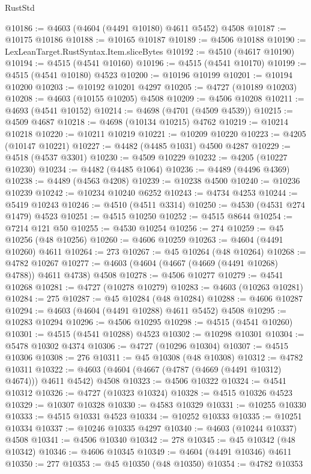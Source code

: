 \begin{lexlean}{RustStd}
\begin{coremodule}
@10186 := @4603 (@4604 (@4491 @10180) @4611 @5452) @4508
@10187 := @10175 @10186
@10188 := @10165 @10187
@10189 := @4506 @10188
@10190 := LexLeanTarget.RustSyntax.Item.sliceBytes
@10192 := @4510 (@4617 @10190)
@10194 := @4515 (@4541 @10160)
@10196 := @4515 (@4541 @10170)
@10199 := @4515 (@4541 @10180) @4523
@10200 := @10196 @10199
@10201 := @10194 @10200
@10203 := @10192 @10201 @4297
@10205 := @4727 (@10189 @10203)
@10208 := @4603 (@10155 @10205) @4508
@10209 := @4506 @10208
@10211 := @4693 (@4541 @10152)
@10214 := @4698 (@4701 (@4509 @4539))
@10215 := @4509 @4687
@10218 := @4698 (@10134 @10215) @4762
@10219 := @10214 @10218
@10220 := @10211 @10219
@10221 := @10209 @10220
@10223 := @4205 (@10147 @10221)
@10227 := @4482 (@4485 @1031) @4500 @4287
@10229 := @4518 (@4537 @3301)
@10230 := @4509 @10229
@10232 := @4205 (@10227 @10230)
@10234 := @4482 (@4485 @1064)
@10236 := @4489 (@4496 @4369)
@10238 := @4489 (@4563 @4208)
@10239 := @10238 @4500
@10240 := @10236 @10239
@10242 := @10234 @10240 @6252
@10243 := @4734 @4253
@10244 := @5419 @10243
@10246 := @4510 (@4511 @3314)
@10250 := @4530 (@4531 @274 @1479) @4523
@10251 := @4515 @10250
@10252 := @4515 @8644
@10254 := @7214 @121 @50
@10255 := @4530 @10254
@10256 := 274
@10259 := @45 @10256 (@48 @10256)
@10260 := @4606 @10259
@10263 := @4604 (@4491 @10260) @4611
@10264 := 273
@10267 := @45 @10264 (@48 @10264)
@10268 := @4782 @10267
@10277 := @4603 (@4604 (@4667 (@4669 (@4491 @10268) @4788)) @4611 @4738) @4508
@10278 := @4506 @10277
@10279 := @4541 @10268
@10281 := @4727 (@10278 @10279)
@10283 := @4603 (@10263 @10281)
@10284 := 275
@10287 := @45 @10284 (@48 @10284)
@10288 := @4606 @10287
@10294 := @4603 (@4604 (@4491 @10288) @4611 @5452) @4508
@10295 := @10283 @10294
@10296 := @4506 @10295
@10298 := @4515 (@4541 @10260)
@10301 := @4515 (@4541 @10288) @4523
@10302 := @10298 @10301
@10304 := @5478 @10302 @4374
@10306 := @4727 (@10296 @10304)
@10307 := @4515 @10306
@10308 := 276
@10311 := @45 @10308 (@48 @10308)
@10312 := @4782 @10311
@10322 := @4603 (@4604 (@4667 (@4787 (@4669 (@4491 @10312) @4674))) @4611 @4542) @4508
@10323 := @4506 @10322
@10324 := @4541 @10312
@10326 := @4727 (@10323 @10324)
@10328 := @4515 @10326 @4523
@10329 := @10307 @10328
@10330 := @4583 @10329
@10331 := @10255 @10330
@10333 := @4515 @10331 @4523
@10334 := @10252 @10333
@10335 := @10251 @10334
@10337 := @10246 @10335 @4297
@10340 := @4603 (@10244 @10337) @4508
@10341 := @4506 @10340
@10342 := 278
@10345 := @45 @10342 (@48 @10342)
@10346 := @4606 @10345
@10349 := @4604 (@4491 @10346) @4611
@10350 := 277
@10353 := @45 @10350 (@48 @10350)
@10354 := @4782 @10353

\end{coremodule}
\end{lexlean}
